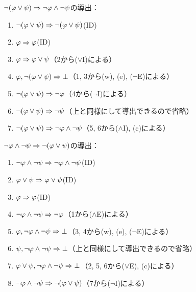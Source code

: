 \(\lnot \paren{\varphi \lor \psi} \sequent \lnot \varphi \land \lnot \psi\)の導出：
\begin{enumerate}
	\item \(\lnot \paren{\varphi \lor \psi} \sequent \lnot \paren{\varphi \lor \psi}\)\quad (ID)
	\item \(\varphi \Rightarrow \varphi\)\quad (ID)
	\item \(\varphi \Rightarrow \varphi \lor \psi\)\quad （2から(\(\lor\)I)による）
	\item \(\varphi, \lnot \paren{\varphi \lor \psi} \sequent \bot\)\quad （1, 3から(w), (e), (\(\lnot\)E)による）
	\item \(\lnot \paren{\varphi \lor \psi} \sequent \lnot \varphi\)\quad （4から(\(\lnot\)I)による）
	\item \(\lnot \paren{\varphi \lor \psi} \sequent \lnot \psi\)\quad （上と同様にして導出できるので省略）
	\item \(\lnot \paren{\varphi \lor \psi} \sequent \lnot \varphi \land \lnot \psi\)\quad （5, 6から(\(\land\)I), (c)による）
\end{enumerate}

\(\lnot \varphi \land \lnot \psi \sequent \lnot \paren{\varphi \lor \psi}\)の導出：
\begin{enumerate}
	\item \(\lnot \varphi \land \lnot \psi \Rightarrow \lnot \varphi \land \lnot \psi\)\quad (ID)
	\item \(\varphi \lor \psi \Rightarrow \varphi \lor \psi\)\quad (ID)
	\item \(\varphi \Rightarrow \varphi\)\quad (ID)
	\item \(\lnot \varphi \land \lnot \psi \Rightarrow \lnot \varphi\)\quad （1から(\(\land\)E)による）
	\item \(\varphi, \lnot \varphi \land \lnot \psi \Rightarrow \bot\)\quad （3, 4から(w), (e), (\(\lnot\)E)による）
	\item \(\psi, \lnot \varphi \land \lnot \psi \Rightarrow \bot\)\quad （上と同様にして導出できるので省略）
	\item \(\varphi \lor \psi, \lnot \varphi \land \lnot \psi \Rightarrow \bot\)\quad （2, 5, 6から(\(\lor\)E), (c)による）
	\item \(\lnot \varphi \land \lnot \psi \sequent \lnot \paren{\varphi \lor \psi}\)\quad （7から(\(\lnot\)I)による）
\end{enumerate}

